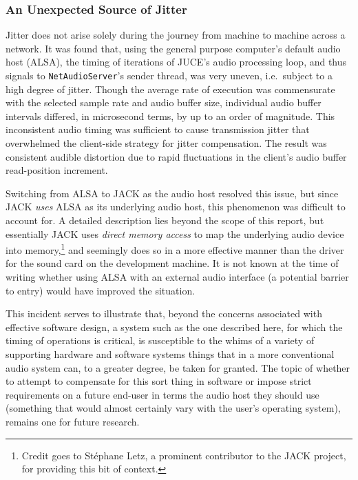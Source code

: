 \subsubsection{An Unexpected Source of Jitter}

Jitter does not arise solely during the journey from machine to machine across
a network.
It was found that, using the general purpose computer's default audio host
(ALSA), the timing of iterations of JUCE's audio processing loop, and thus
signals to \texttt{NetAudioServer}'s sender thread, was very uneven, i.e.\
subject to a high degree of jitter.
Though the average rate of execution was commensurate with the selected sample
rate and audio buffer size, individual audio buffer intervals differed, in
microsecond terms, by up to an order of magnitude. This inconsistent audio
timing was sufficient to cause transmission jitter that overwhelmed
the client-side strategy for jitter compensation.
The result was consistent audible distortion due to rapid fluctuations in the
client's audio buffer read-position increment.

Switching from ALSA to JACK as the audio host resolved this issue, but since
JACK \textit{uses} ALSA as its underlying audio host, this phenomenon was
difficult to account for.
A detailed description lies beyond the scope of this report, but
essentially JACK uses \textit{direct memory access} to map the underlying audio
device into memory,\footnote{
    Credit goes to Stéphane Letz, a prominent contributor to the JACK project,
    for providing this bit of context.
} and seemingly does so in a more effective manner than the driver
for the sound card on the development machine.
It is not known at the time of writing whether using ALSA with an external audio
interface (a potential barrier to entry) would have improved the situation.

This incident serves to illustrate that, beyond the concerns associated
with effective software design, a system such as the one described here, for
which the timing of operations is critical, is susceptible to the whims of
a variety of supporting hardware and software systems \textemdash{} things
that in a more conventional audio system can, to a greater degree, be taken for
granted.
The topic of whether to attempt to compensate for this sort thing in software
or impose strict requirements on a future end-user in terms the audio host they
should use (something that would almost certainly vary with the user's
operating system), remains one for future research.

